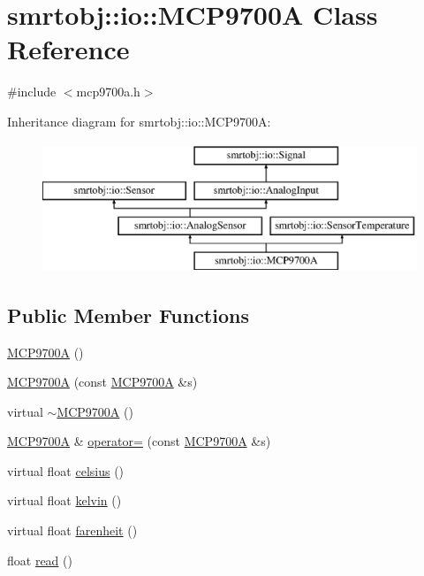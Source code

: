 \hypertarget{classsmrtobj_1_1io_1_1_m_c_p9700_a}{}\section{smrtobj\+:\+:io\+:\+:M\+C\+P9700\+A Class Reference}
\label{classsmrtobj_1_1io_1_1_m_c_p9700_a}


{\ttfamily \#include $<$mcp9700a.\+h$>$}

Inheritance diagram for smrtobj\+:\+:io\+:\+:M\+C\+P9700\+A\+:\begin{figure}[H]
\begin{center}
\leavevmode
\includegraphics[height=3.868739cm]{classsmrtobj_1_1io_1_1_m_c_p9700_a}
\end{center}
\end{figure}
\subsection*{Public Member Functions}
\begin{DoxyCompactItemize}
\item 
\hyperlink{classsmrtobj_1_1io_1_1_m_c_p9700_a_a37975b91512826148e13fbc3301ba880}{M\+C\+P9700\+A} ()
\item 
\hyperlink{classsmrtobj_1_1io_1_1_m_c_p9700_a_a9ac9150fc7e74ae272984f254f34725e}{M\+C\+P9700\+A} (const \hyperlink{classsmrtobj_1_1io_1_1_m_c_p9700_a}{M\+C\+P9700\+A} \&s)
\item 
virtual \hyperlink{classsmrtobj_1_1io_1_1_m_c_p9700_a_a024fb11c7b84245d07b2f87ec1f35fa8}{$\sim$\+M\+C\+P9700\+A} ()
\item 
\hyperlink{classsmrtobj_1_1io_1_1_m_c_p9700_a}{M\+C\+P9700\+A} \& \hyperlink{classsmrtobj_1_1io_1_1_m_c_p9700_a_ad8bdad45ad4119634fad768ed0b0dd3c}{operator=} (const \hyperlink{classsmrtobj_1_1io_1_1_m_c_p9700_a}{M\+C\+P9700\+A} \&s)
\item 
virtual float \hyperlink{classsmrtobj_1_1io_1_1_m_c_p9700_a_ac80d2ee7705df843f6353f579be6f773}{celsius} ()
\item 
virtual float \hyperlink{classsmrtobj_1_1io_1_1_m_c_p9700_a_a5ed9f0c208b167fd8e4e1338062d8668}{kelvin} ()
\item 
virtual float \hyperlink{classsmrtobj_1_1io_1_1_m_c_p9700_a_a15dc548ff322a4e9f831273d96023038}{farenheit} ()
\item 
float \hyperlink{classsmrtobj_1_1io_1_1_m_c_p9700_a_ae50f36dae107dc570ad98646ba684a20}{read} ()
\end{DoxyCompactItemize}
